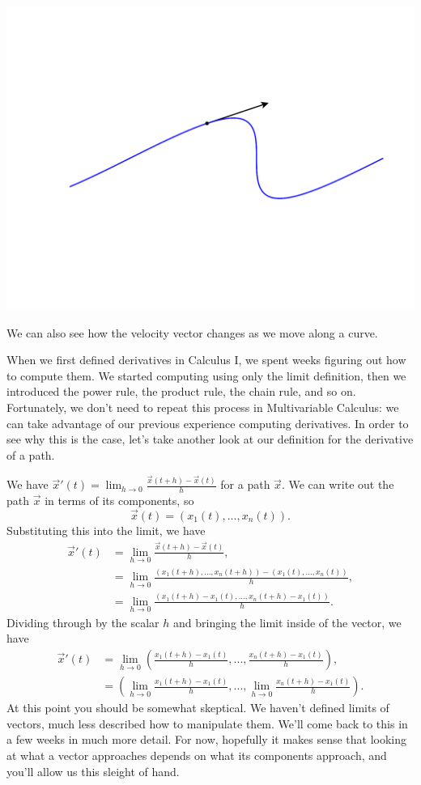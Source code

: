 \documentclass{ximera}
\begin{document}
\begin{image}
\includegraphics[width=\textwidth]{CalcPlot3D-vel_vector}
\end{image}

We can also see how the velocity vector changes as we move along a curve.


When we first defined derivatives in Calculus I, we spent weeks figuring out how to compute them. We started computing using only the limit definition, then we introduced the power rule, the product rule, the chain rule, and so on. Fortunately, we don't need to repeat this process in Multivariable Calculus: we can take advantage of our previous experience computing derivatives. In order to see why this is the case, let's take another look at our definition for the derivative of a path.

We have $\vec{x}'(t) = \lim_{h\rightarrow 0} \frac{\vec{x}(t+h) - \vec{x}(t)}{h}$ for a path $\vec{x}$. We can write out the path $\vec{x}$ in terms of its components, so
\[
\vec{x}(t) = (x_1(t),...,x_n(t)).
\]
Substituting this into the limit, we have
\begin{align*}
\vec{x}'(t) &= \lim_{h\rightarrow 0} \frac{\vec{x}(t+h) - \vec{x}(t)}{h},\\
&= \lim_{h\rightarrow 0}\frac{(x_1(t+h),...,x_n(t+h)) - (x_1(t),...,x_n(t))}{h},\\
&= \lim_{h\rightarrow 0}\frac{(x_1(t+h) - x_1(t),...,x_n(t+h) - x_1(t))}{h}.
\end{align*}
Dividing through by the scalar $h$ and bringing the limit inside of the vector, we have 
\begin{align*}
\vec{x}'(t) &= \lim_{h\rightarrow 0}\left(\frac{x_1(t+h) - x_1(t)}{h},...,\frac{x_n(t+h) - x_1(t)}{h}\right),\\
&= \left(\lim_{h\rightarrow 0}\frac{x_1(t+h) - x_1(t)}{h},...,\lim_{h\rightarrow 0}\frac{x_n(t+h) - x_1(t)}{h}\right).
\end{align*}
At this point you should be somewhat skeptical. We haven't defined limits of vectors, much less described how to manipulate them. We'll come back to this in a few weeks in much more detail. For now, hopefully it makes sense that looking at what a vector approaches depends on what its components approach, and you'll allow us this sleight of hand.
\end{document}

